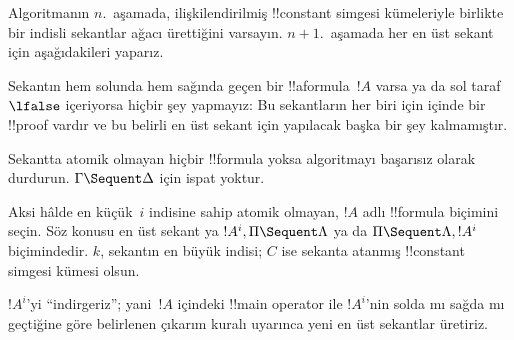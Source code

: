 Algoritmanın $n$.~aşamada, ilişkilendirilmiş !!{constant} simgesi kümeleriyle
birlikte bir indisli sekantlar ağacı ürettiğini varsayın. $n+1$.~aşamada her
en üst sekant için aşağıdakileri yaparız.

Sekantın hem solunda hem sağında geçen bir !!a{formula}~$!A$ varsa ya da
sol taraf~$\lfalse$ içeriyorsa hiçbir şey yapmayız: Bu sekantların her biri
için  içinde bir !!{proof} vardır ve bu belirli en üst sekant için yapılacak
başka bir şey kalmamıştır.

Sekantta atomik olmayan hiçbir !!{formula} yoksa algoritmayı başarısız olarak
durdurun. $\Gamma \Sequent \Delta$ için ispat yoktur.

Aksi hâlde en küçük~$i$ indisine sahip atomik olmayan, $!A$ adlı !!{formula} biçimini
seçin. Söz konusu en üst sekant ya $!A^i, \Pi \Sequent \Lambda$ ya da
$\Pi \Sequent \Lambda, !A^i$ biçimindedir. $k$, sekantın en büyük indisi;
$C$ ise sekanta atanmış !!{constant} simgesi kümesi olsun.

$!A^i$'yi ``indirgeriz''; yani~$!A$ içindeki !!{main operator} ile $!A^i$'nin
solda mı sağda mı geçtiğine göre belirlenen çıkarım kuralı uyarınca yeni en
üst sekantlar üretiriz.

